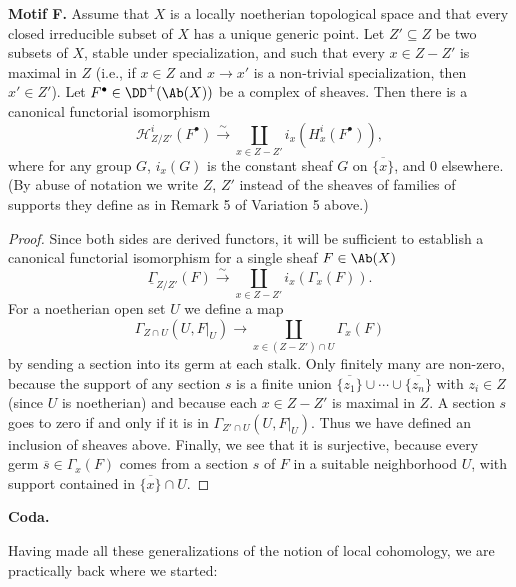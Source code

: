 \medskip{}\label{motif:4.1.F}\noindent\textbf{Motif F.} Assume that $X$ is a locally noetherian topological space and that every closed irreducible subset of $X$ has a unique generic point. Let $Z'\subseteq Z$ be two subsets of $X$, stable under specialization, and such that every $x\in Z-Z'$ is maximal in $Z$ (i.e., if $x\in Z$ and $x\to x'$ is a non-trivial specialization, then $x'\in Z'$). Let $F^\bullet\in\DD^+(\Ab(X))$ be a complex of sheaves. Then there is a canonical functorial isomorphism
\[
\mathcal{H}_{Z/Z'}^{i}(F^\bullet) \xrightarrow{\sim} \coprod_{x\in Z-Z'} i_x(H_x^{i}(F^\bullet)),
\]
where for any group $G$, $i_x(G)$ is the constant sheaf $G$ on $\overline{\{x\}}$, and $0$ elsewhere. (By abuse of notation we write $Z$, $Z'$ instead of the sheaves of families of supports they define as in Remark 5 of Variation 5 above.)
\begin{proof}
Since both sides are derived functors, it will be sufficient to establish a canonical functorial isomorphism for a single sheaf $F\in\Ab(X)$
\[
\underline{\Gamma}_{Z/Z'}(F)\xrightarrow{\sim} \coprod_{x\in Z-Z'} i_x(\Gamma_x(F)).
\]
For a noetherian open set $U$ we define a map
\[
\Gamma_{Z\cap U}(U,F|_U)\longrightarrow \coprod_{x\in (Z-Z')\cap U} \Gamma_x(F)
\]
by sending a section into its germ at each stalk. Only finitely many are non-zero, because the support of any section $s$ is a finite union $\overline{\{z_1\}}\cup\cdots\cup\overline{\{z_n\}}$ with $z_i\in Z$ (since $U$ is noetherian) and because each $x\in Z-Z'$ is maximal in $Z$. A section $s$ goes to zero if and only if it is in $\Gamma_{Z'\cap U}(U,F|_U)$. Thus we have defined an inclusion of sheaves above. Finally, we see that it is surjective, because every germ $\overline{s}\in\Gamma_x(F)$ comes from a section $s$ of $F$ in a suitable neighborhood $U$, with support contained in $\overline{\{x\}}\cap U$.
\end{proof}

\medskip\noindent\textbf{Coda.}

Having made all these generalizations of the notion of local cohomology, we are practically back where we started:

